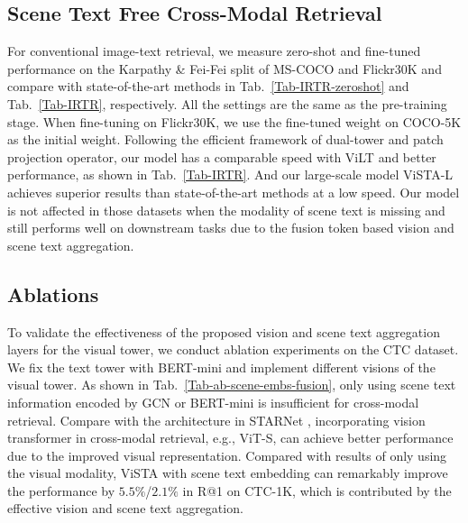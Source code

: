 \documentclass[10pt,twocolumn,letterpaper]{article}
\begin{document}
\subsection{Scene Text Free Cross-Modal Retrieval}
For conventional image-text retrieval, we measure zero-shot and fine-tuned performance on the Karpathy \& Fei-Fei split of MS-COCO and Flickr30K \cite{flickr30k} and compare with state-of-the-art methods in Tab.~\ref{Tab-IRTR-zeroshot} and Tab.~\ref{Tab-IRTR}, respectively. All the settings are the same as the pre-training stage. When fine-tuning on Flickr30K, we use the fine-tuned weight on COCO-5K as the initial weight. Following the efficient framework of dual-tower and patch projection operator, our model has a comparable speed with ViLT \cite{ViLT} and better performance, as shown in Tab.~\ref{Tab-IRTR}. And our large-scale model ViSTA-L achieves superior results than state-of-the-art methods at a low speed. 
Our model is not affected in those datasets when the modality of scene text is missing and still performs well on downstream tasks due to the fusion token based vision and scene text aggregation.


\subsection{Ablations}
To validate the effectiveness of the proposed vision and scene text aggregation layers for the visual tower, we conduct ablation experiments on the CTC dataset. We fix the text tower with BERT-mini and implement different visions of the visual tower. 
As shown in Tab.~\ref{Tab-ab-scene-embs-fusion}, only using scene text information encoded by GCN or BERT-mini is insufficient for cross-modal retrieval. Compare with the architecture in STARNet \cite{STARNet}, incorporating vision transformer in cross-modal retrieval, e.g., ViT-S, can achieve better performance due to the improved visual representation. Compared with results of only using the visual modality, ViSTA with scene text embedding can remarkably improve the performance by $5.5\%$/$2.1\%$ in R@1 on CTC-1K, which is contributed by the effective vision and scene text aggregation.
\end{document}
